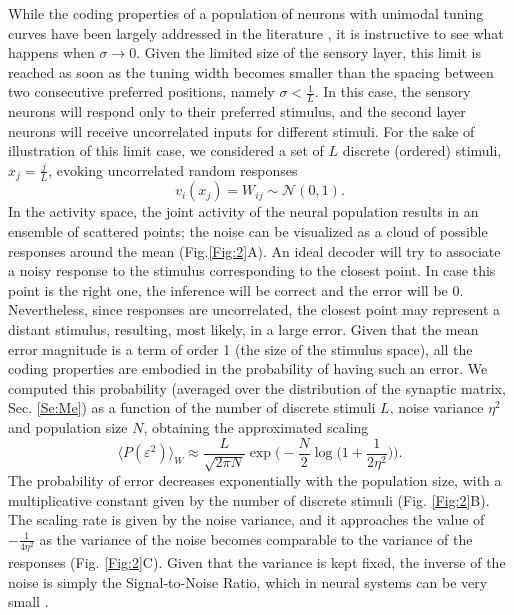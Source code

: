 \documentclass[a4paper]{article}
\begin{document}
While the coding properties of a population of neurons with unimodal tuning curves  have been largely addressed in the literature \cite[]{Zhang1999NeuronalBroaden,Montemurro2006OptimalVariables,Yaeli2010Error-basedNeurons}, it is instructive to see what happens when $\sigma \rightarrow 0 $. Given the limited size of the sensory layer, this limit is reached as soon as the tuning width becomes smaller than the spacing between two consecutive preferred positions, namely $\sigma < \frac{1}{L}$.
In this case, the sensory neurons will respond only to their preferred stimulus, and the second layer neurons will receive uncorrelated inputs for different stimuli. For the sake of illustration of this limit case, we considered  a set of $L$ discrete (ordered) stimuli, $x_j = \frac{j}{L}$, evoking  uncorrelated  random responses
\begin{equation}
v_i(x_j) = W_{ij} \sim \mathcal{N}(0,1) .
\end{equation}
In the activity space, the joint activity of the neural population results in an ensemble of scattered points; the noise can be visualized as a cloud of possible responses around the mean (Fig.\ref{Fig:2}A).
An ideal decoder will try to associate a noisy response to the stimulus corresponding to the closest point. In case this point is the right one, the inference will be correct and the error will be $0$. Nevertheless, since responses are uncorrelated, the closest point may represent a distant stimulus, resulting, most likely, in a large error. Given that the mean error magnitude is a term of order 1 (the size of the stimulus space), all the coding properties are embodied in the probability of having such an error.
We computed this probability  (averaged over the distribution of the synaptic matrix, Sec. \ref{Se:Me}) as a function of the number of discrete stimuli $L$, noise variance $\eta^2$ and population size $N$, obtaining the approximated scaling
\begin{equation}
\langle P(\varepsilon^2)\rangle_W \approx \frac{L}{\sqrt{2\pi N}} \exp{\Big(-\frac{N}{2} \log\big(1+\frac{1}{2\eta^2}\big)\Big)}.
\label{Eq:PGE}
\end{equation}The probability of error decreases exponentially with the population size, with a multiplicative constant given by the number of discrete stimuli  (Fig. \ref{Fig:2}B). 
The scaling rate is given by the noise variance, and it approaches the value of $-\frac{1}{4\eta^2}$ as the variance of the noise becomes comparable to the variance of the responses (Fig. \ref{Fig:2}C). Given that the variance is kept fixed, the inverse of the noise is simply the Signal-to-Noise Ratio, which in neural systems can be very small \cite[]{Softky1993TheEPSPs}.
\end{document}
